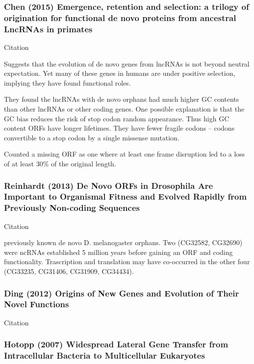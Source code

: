 \subsubsection{Chen (2015) Emergence, retention and
selection: a trilogy of origination for functional de novo proteins from
ancestral LncRNAs in primates}

    Citation \cite{chen_emergence_2015}

    Suggests that the evolution of de novo genes from lncRNAs is not beyond
    neutral expectation. Yet many of these genes in humans are under positive
    selection, implying they have found functional roles.

    They found the lncRNAs with de novo orphans had much higher GC contents
    than other lncRNAs or other coding genes. One possible explanation is that
    the GC bias reduces the risk of stop codon random appearance. Thus high GC
    content ORFs have longer lifetimes. They have fewer fragile codons --
    codons convertible to a stop codon by a single missense mutation.

    Counted a missing ORF as one where at least one frame disruption led to a
    loss of at least 30\% of the original length.

\subsubsection{Reinhardt (2013) De Novo ORFs in Drosophila Are Important to
Organismal Fitness and Evolved Rapidly from Previously Non-coding Sequences}
    
    Citation \cite{reinhardt_novo_2013}

    previously known \cite{levine_novel_2006, zhou_origin_2008} de novo D.
    melanogaster orphans. Two (CG32582, CG32690) were ncRNAs established 5
    million years before gaining an ORF and coding functionality.
    Trascription and translation may have co-occurred in the other four
    (CG33235, CG31406, CG31909, CG34434).

\subsubsection{Ding (2012) Origins of New Genes and Evolution of Their
Novel Functions}
    
    Citation \cite{ding_origins_2012}

\subsubsection{Hotopp (2007) Widespread Lateral Gene Transfer from
Intracellular Bacteria to Multicellular Eukaryotes}

